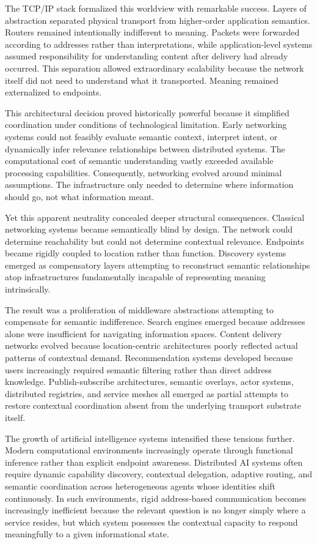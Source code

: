 \documentclass[11pt,a4paper]{article}
\begin{document}
The TCP/IP stack formalized this worldview with remarkable success. Layers of abstraction separated physical transport from higher-order application semantics. Routers remained intentionally indifferent to meaning. Packets were forwarded according to addresses rather than interpretations, while application-level systems assumed responsibility for understanding content after delivery had already occurred. This separation allowed extraordinary scalability because the network itself did not need to understand what it transported. Meaning remained externalized to endpoints.

This architectural decision proved historically powerful because it simplified coordination under conditions of technological limitation. Early networking systems could not feasibly evaluate semantic context, interpret intent, or dynamically infer relevance relationships between distributed systems. The computational cost of semantic understanding vastly exceeded available processing capabilities. Consequently, networking evolved around minimal assumptions. The infrastructure only needed to determine where information should go, not what information meant.

Yet this apparent neutrality concealed deeper structural consequences. Classical networking systems became semantically blind by design. The network could determine reachability but could not determine contextual relevance. Endpoints became rigidly coupled to location rather than function. Discovery systems emerged as compensatory layers attempting to reconstruct semantic relationships atop infrastructures fundamentally incapable of representing meaning intrinsically.

The result was a proliferation of middleware abstractions attempting to compensate for semantic indifference. Search engines emerged because addresses alone were insufficient for navigating information spaces. Content delivery networks evolved because location-centric architectures poorly reflected actual patterns of contextual demand. Recommendation systems developed because users increasingly required semantic filtering rather than direct address knowledge. Publish-subscribe architectures, semantic overlays, actor systems, distributed registries, and service meshes all emerged as partial attempts to restore contextual coordination absent from the underlying transport substrate itself.

The growth of artificial intelligence systems intensified these tensions further. Modern computational environments increasingly operate through functional inference rather than explicit endpoint awareness. Distributed AI systems often require dynamic capability discovery, contextual delegation, adaptive routing, and semantic coordination across heterogeneous agents whose identities shift continuously. In such environments, rigid address-based communication becomes increasingly inefficient because the relevant question is no longer simply where a service resides, but which system possesses the contextual capacity to respond meaningfully to a given informational state.
\end{document}
